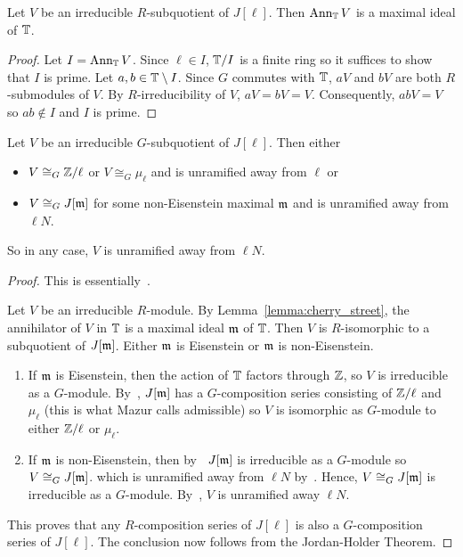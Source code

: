 \documentclass{article}
\begin{document}
\begin{lemma}\label{lemma:cherry_street}
    Let $V$ be an irreducible $R$-subquotient of $J[\ell]$. Then $\operatorname{Ann}_{\mathbb{T}} V$
    is a maximal ideal of $\mathbb{T}$.
\end{lemma}
\begin{proof}
    Let $I=\operatorname{Ann}_{\mathbb{T}} V$. Since $\ell\in I$, $\mathbb{T}/I$ is a finite ring so it
    suffices to show that $I$ is prime. Let $a,b\in \mathbb{T}\setminus I$. Since $G$
    commutes with $\mathbb{T}$, $aV$ and $bV$ are both $R$-submodules of $V$. By
    $R$-irreducibility of $V$, $aV=bV=V$. Consequently, $abV=V$ so $ab\notin I$
    and $I$ is prime.
\end{proof}

\begin{theorem}\label{theorem:irreducible_G_sub}
    Let $V$ be an irreducible $G$-subquotient of $J[\ell]$. Then either
    \begin{itemize}
        \item
            $V\cong_G \mathbb{Z}/\ell$ or $V\cong_G \mu_\ell$ and is unramified away
            from $\ell$ or
        \item 
            $V\cong_G J[\mathfrak{m}]$ for some non-Eisenstein maximal $\mathfrak{m}$ and is
            unramified away from $\ell N$.
    \end{itemize}
    So in any case, $V$ is unramified away from $\ell N$.
\end{theorem}
\begin{proof}
    This is essentially~\cite[\S 14]{mazur:eisenstein}. 

    Let $V$ be an irreducible $R$-module. By Lemma~\ref{lemma:cherry_street},
    the annihilator of $V$ in $\mathbb{T}$ is a maximal ideal $\mathfrak{m}$ of $\mathbb{T}$. Then $V$
    is $R$-isomorphic to a subquotient of $J[\mathfrak{m}]$. Either $\mathfrak{m}$ is Eisenstein or
    $\mathfrak{m}$ is non-Eisenstein.
    \begin{enumerate}
        \item
            If $\mathfrak{m}$ is Eisenstein, then the action of $\mathbb{T}$ factors through
            $\mathbb{Z}$, so $V$ is irreducible as a $G$-module. By~\cite[Proposition
            14.1]{mazur:eisenstein}, $J[\mathfrak{m}]$ has a $G$-composition series
            consisting of $\mathbb{Z}/\ell$ and $\mu_\ell$ (this is what Mazur calls
            admissible) so $V$ is isomorphic as $G$-module to either $\mathbb{Z}/\ell$
            or $\mu_\ell$.
        \item
            If $\mathfrak{m}$ is non-Eisenstein, then by~\cite[Proposition
            14.2]{mazur:eisenstein} $J[\mathfrak{m}]$ is irreducible as a $G$-module so
            $V\cong_G J[\mathfrak{m}]$. which is unramified away from $\ell N$
            by~\cite[Theorem 6.7]{deligne-serre}. Hence, $V\cong_G J[\mathfrak{m}]$ is
            irreducible as a $G$-module. By~\cite[Theorem 6.7]{deligne-serre},
            $V$ is unramified away $\ell N$.
    \end{enumerate}
    This proves that any $R$-composition series of $J[\ell]$ is also a
    $G$-composition series of $J[\ell]$. The conclusion now follows from the
    Jordan-Holder Theorem.
\end{proof} 
\end{document}
